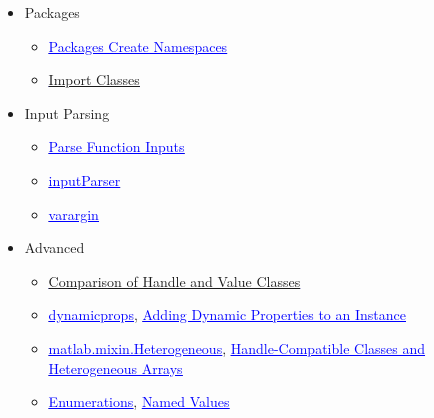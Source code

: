 \documentclass[10pt]{exam}
\newcommand\myurl[1]{\textcolor{blue}{\underline{#1}}}
\begin{document}
\begin{itemize}
\begin{itemize}
		\end{itemize}
		\item Packages
		\begin{itemize} 
			\item \href{https://www.mathworks.com/help/matlab/matlab_oop/scoping-classes-with-packages.html}{\myurl{Packages Create Namespaces}}
			\item \myurl{\href{https://www.mathworks.com/help/matlab/matlab_oop/importing-classes.html}{Import Classes}}
		\end{itemize}
		\item Input Parsing
		\begin{itemize}
			\item \href{https://www.mathworks.com/help/matlab/matlab_prog/parse-function-inputs.html}{\myurl{Parse Function Inputs}}
			\item \href{https://www.mathworks.com/help/matlab/ref/inputparser.html?s_tid=doc_ta}{\myurl{inputParser}}
			\item \href{https://www.mathworks.com/help/matlab/ref/varargin.html}{\myurl{varargin}}
		\end{itemize}
		\item Advanced 
		\begin{itemize}
			\item \myurl{\href{https://www.mathworks.com/help/matlab/matlab_oop/comparing-handle-and-value-classes.html}{Comparison of Handle and Value Classes}}
			\item \href{https://www.mathworks.com/help/matlab/ref/dynamicprops-class.html?s_tid=doc_ta}{\myurl{dynamicprops}}, \href{https://www.mathworks.com/help/matlab/matlab_oop/dynamic-properties-adding-properties-to-an-instance.html}{\myurl{Adding Dynamic Properties to an Instance}}
			\item \href{https://www.mathworks.com/help/matlab/ref/matlab.mixin.heterogeneous-class.html}{\myurl{matlab.mixin.Heterogeneous}}, \href{https://www.mathworks.com/help/matlab/matlab_oop/handle-compatible-classes-and-heterogeneous-arrays.html}{\myurl{Handle-Compatible Classes and Heterogeneous Arrays}}
			\item \href{https://www.mathworks.com/help/matlab/enumeration-classes.html?s_tid=CRUX_lftnav}{\myurl{Enumerations}}, \href{https://www.mathworks.com/help/matlab/matlab_oop/defining-named-values.html}{\myurl{Named Values}}
		\end{itemize}
	\end{itemize} 
\end{document}
